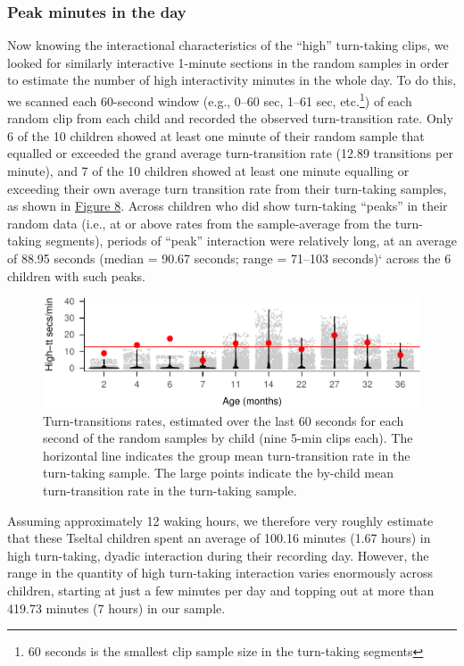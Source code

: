 \documentclass[floatsintext,man]{apa6}
\theoremstyle{definition}
\theoremstyle{definition}
\theoremstyle{definition}
\theoremstyle{remark}
\begin{document}
\subsubsection{Peak minutes in the day}\label{peak-minutes-in-the-day}

Now knowing the interactional characteristics of the \enquote{high}
turn-taking clips, we looked for similarly interactive 1-minute sections
in the random samples in order to estimate the number of high
interactivity minutes in the whole day. To do this, we scanned each
60-second window (e.g., 0--60 sec, 1--61 sec, etc.\footnote{60 seconds
  is the smallest clip sample size in the turn-taking segments}) of each
random clip from each child and recorded the observed turn-transition
rate. Only 6 of the 10 children showed at least one minute of their
random sample that equalled or exceeded the grand average
turn-transition rate (12.89 transitions per minute), and 7 of the 10
children showed at least one minute equalling or exceeding their own
average turn transition rate from their turn-taking samples, as shown in
\protect\hyperlink{fig8}{Figure 8}. Across children who did show
turn-taking \enquote{peaks} in their random data (i.e., at or above
rates from the sample-average from the turn-taking segments), periods of
\enquote{peak} interaction were relatively long, at an average of 88.95
seconds (median = 90.67 seconds; range = 71--103 seconds)` across the 6
children with such peaks.

\begin{figure}
\centering
\includegraphics{Tseltal-CLE_files/figure-latex/fig8-1.pdf}
\caption{\label{fig:fig8}Turn-transitions rates, estimated over the last 60
seconds for each second of the random samples by child (nine 5-min clips
each). The horizontal line indicates the group mean turn-transition rate
in the turn-taking sample. The large points indicate the by-child mean
turn-transition rate in the turn-taking sample.}
\end{figure}

Assuming approximately 12 waking hours, we therefore very roughly
estimate that these Tseltal children spent an average of 100.16 minutes
(1.67 hours) in high turn-taking, dyadic interaction during their
recording day. However, the range in the quantity of high turn-taking
interaction varies enormously across children, starting at just a few
minutes per day and topping out at more than 419.73 minutes (7 hours) in
our sample.
\end{document}
